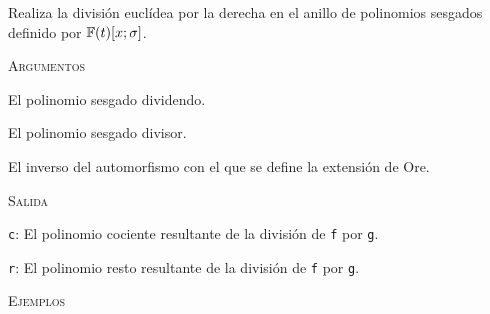 \begin{description}[leftmargin=1em, font=\ttfamily, style=nextline]

    \item[RightED(f, g, inverse\_aut)]
    
    Realiza la división euclídea por la derecha en el anillo de polinomios sesgados definido por $\mathbb{F}(t)[x;\sigma]$.

    \textsc{Argumentos}

    \begin{description}[font=\normalfont\ttfamily]
        \item[f] El polinomio sesgado dividendo.
        \item[g] El polinomio sesgado divisor.
        \item[inverse\_aut] El inverso del automorfismo con el que se define la extensión de Ore.
    \end{description}

    \textsc{Salida}

    \begin{description}[font=\normalfont\ttfamily]
        \item[] \texttt{c}: El polinomio cociente resultante de la división de \texttt{f} por \texttt{g}.
        \item[] \texttt{r}: El polinomio resto resultante de la división de \texttt{f} por \texttt{g}.
    \end{description}

    \textsc{Ejemplos}


\end{description}
